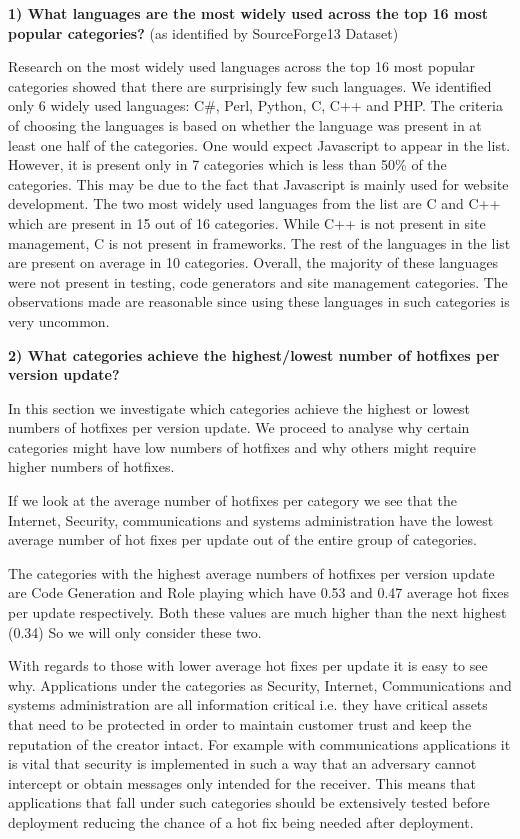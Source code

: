 \textbf{1) What languages are the most widely used across the top 16 most popular categories?} (as identified by SourceForge13 Dataset) 

Research on the most widely used languages across the top 16 most popular categories showed that there are surprisingly few such languages. We identified only 6 widely used languages: C\#, Perl, Python, C, C++ and PHP. The criteria of choosing the languages is based on whether the language was present in at least one half of the categories. One would expect Javascript to appear in the list. However, it is present only in 7 categories which is less than 50\% of the categories. This may be due to the fact that Javascript is mainly used for website development. The two most widely used languages from the list are C and C++ which are present in 15 out of 16 categories. While C++ is not present in site management, C is not present in frameworks. The rest of the languages in the list are present on average in 10 categories. Overall, the majority of these languages were not present in testing, code generators and site management categories. The observations made are reasonable since using these languages in such categories is very uncommon.

\textbf{2) What categories achieve the highest/lowest number of hotfixes per version update?}
    
In this section we investigate which categories achieve the highest or lowest numbers of hotfixes per version update. We proceed to analyse why certain categories might have low numbers of hotfixes and why others might require higher numbers of hotfixes.

If we look at the average number of hotfixes per category we see that the Internet, Security, communications and systems administration have the lowest average number of hot fixes per update out of the entire group of categories. 

The categories with the highest average numbers of hotfixes per version update are Code Generation and Role playing which have 0.53 and 0.47 average hot fixes per update respectively. Both these values are much higher than the next highest (0.34) So we will only consider these two.

With regards to those with lower average hot fixes per update it is easy to see why. Applications under the categories as Security, Internet, Communications and systems administration are all information critical i.e. they have critical assets that need to be protected in order to maintain customer trust and keep the reputation of the creator intact. For example with communications applications it is vital that security is implemented in such a way that an adversary cannot intercept or obtain messages only intended for the receiver. This means that applications that fall under such categories should be extensively tested before deployment reducing the chance of a hot fix being needed after deployment.

